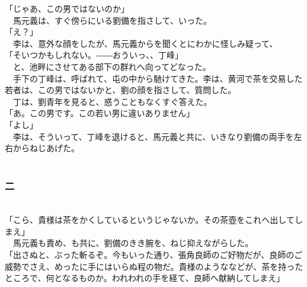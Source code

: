 \documentclass[
  paper=a5,
  fontsize=10pt,
  jafontsize=9.5pt,
  tate,                  %
  open_bracket_pos=nibu, %
]{jlreq}
\begin{document}
「じゃあ、この男ではないのか」\\


　馬元義は、すぐ傍らにいる劉備を指さして、いった。\\


「え？」\\


　李は、意外な顔をしたが、馬元義からを聞くとにわかに怪しみ疑って、\\


「そいつかもしれない。――おういっ、、丁峰」\\


　と、池畔にさせてある部下の群れへ向ってどなった。\\


　手下の丁峰は、呼ばれて、屯の中から馳けてきた。李は、黄河で茶を交易した若者は、この男ではないかと、劉の顔を指さして、質問した。\\


　丁は、劉青年を見ると、惑うこともなくすぐ答えた。\\


「あ。この男です。この若い男に違いありません」\\


「よし」\\


　李は、そういって、丁峰を退けると、馬元義と共に、いきなり劉備の両手を左右からねじあげた。\\

\\

\subsubsection{二}

\\


「こら、貴様は茶をかくしているというじゃないか。その茶壺をこれへ出してしまえ」\\


　馬元義も責め、も共に、劉備のきき腕を、ねじ抑えながらした。\\


「出さぬと、ぶった斬るぞ。今もいった通り、張角良師のご好物だが、良師のご威勢でさえ、めったに手にはいらぬ程の物だ。貴様のようななどが、茶を持ったところで、何となるものか。われわれの手を経て、良師へ献納してしまえ」\\
\end{document}
